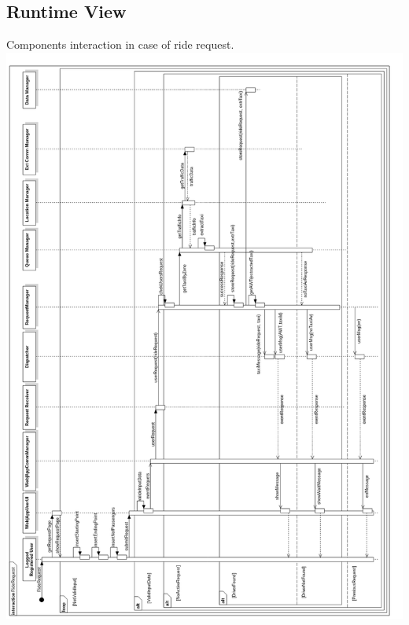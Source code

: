 \documentclass[11pt,titlepage]{article} %
\newenvironment{changemargin}[3]{%
\begin{list}{}{%
\setlength{\topsep}{0pt}%
\setlength{\headsep}{#3}%
\setlength{\leftmargin}{#1}%
\setlength{\rightmargin}{#2}%
\setlength{\listparindent}{\parindent}%
\setlength{\itemindent}{\parindent}%
\setlength{\parsep}{\parskip}%
}%
\item[]}{\end{list}}
\begin{document}
\subsection{Runtime View}
\begin{changemargin}{0cm}{0cm}{0cm}
	Components interaction in case of ride request.\newline
	\noindent
	\includegraphics[scale=0.35]{sd1.png}
\end{changemargin}
\newpage
\end{document}
